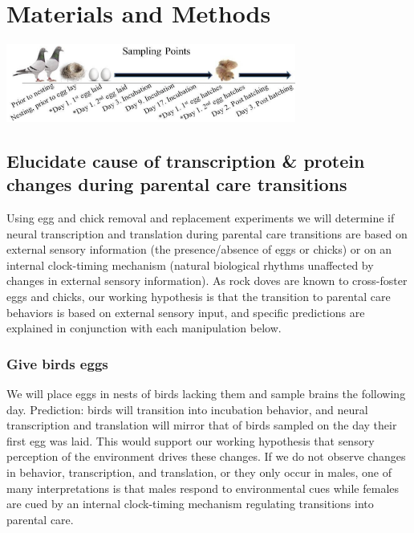 \documentclass[10pt,letterpaper]{article}
\begin{document}
\hypertarget{materials-and-methods}{%
\section{Materials and Methods}\label{materials-and-methods}}

\includegraphics[width=360px]{../figures/images/samplingtimepoints}

\hypertarget{elucidate-cause-of-transcription-protein-changes-during-parental-care-transitions}{%
\subsection{Elucidate cause of transcription \& protein changes during
parental care
transitions}\label{elucidate-cause-of-transcription-protein-changes-during-parental-care-transitions}}

Using egg and chick removal and replacement experiments we will
determine if neural transcription and translation during parental care
transitions are based on external sensory information (the
presence/absence of eggs or chicks) or on an internal clock-timing
mechanism (natural biological rhythms unaffected by changes in external
sensory information). As rock doves are known to cross-foster eggs and
chicks, our working hypothesis is that the transition to parental care
behaviors is based on external sensory input, and specific predictions
are explained in conjunction with each manipulation below.

\hypertarget{give-birds-eggs}{%
\subsubsection{Give birds eggs}\label{give-birds-eggs}}

We will place eggs in nests of birds lacking them and sample brains the
following day. Prediction: birds will transition into incubation
behavior, and neural transcription and translation will mirror that of
birds sampled on the day their first egg was laid. This would support
our working hypothesis that sensory perception of the environment drives
these changes. If we do not observe changes in behavior, transcription,
and translation, or they only occur in males, one of many
interpretations is that males respond to environmental cues while
females are cued by an internal clock-timing mechanism regulating
transitions into parental care.
\end{document}
